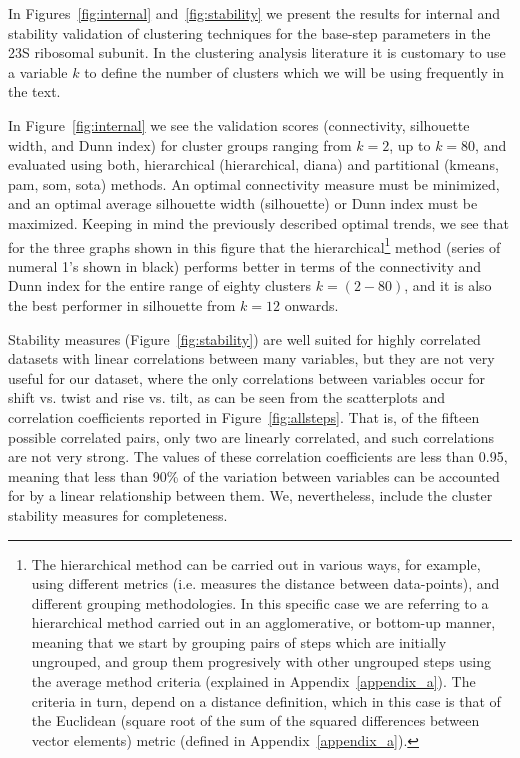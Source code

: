In  Figures~\ref{fig:internal} and~\ref{fig:stability} we  present the
results for internal and stability validation of clustering techniques
for the  base-step parameters  in the 23S  ribosomal subunit.   In the
clustering analysis literature  it is customary to use  a variable $k$
to define the number of clusters  which we will be using frequently in
the text.

In   Figure~\ref{fig:internal}   we    see   the   validation   scores
(connectivity, silhouette  width, and  Dunn index) for  cluster groups
ranging  from   $k=2$,  up  to  $k=80$,  and   evaluated  using  both,
hierarchical (hierarchical, diana)  and partitional (kmeans, pam, som,
sota) methods. An optimal  connectivity measure must be minimized, and
an optimal average silhouette width (silhouette) or Dunn index must be
maximized.  Keeping  in mind the previously  described optimal trends,
we  see that  for  the three  graphs  shown in  this  figure that  the
hierarchical\footnote{The  hierarchical method can  be carried  out in
  various ways,  for example, using different  metrics (i.e.  measures
  the   distance   between   data-points),  and   different   grouping
  methodologies.   In  this  specific  case  we  are  referring  to  a
  hierarchical method  carried out  in an agglomerative,  or bottom-up
  manner, meaning that  we start by grouping pairs  of steps which are
  initially  ungrouped,   and  group  them   progresively  with  other
  ungrouped  steps using  the  average method  criteria (explained  in
  Appendix~\ref{appendix_a}).  The  criteria  in  turn,  depend  on  a
  distance definition,  which in  this case is  that of  the Euclidean
  (square root  of the sum  of the squared differences  between vector
  elements)  metric (defined  in  Appendix~\ref{appendix_a}).}  method
(series of numeral 1's shown in black) performs better in terms of the
connectivity and  Dunn index for  the entire range of  eighty clusters
$k=(2-80)$,  and it  is also  the  best performer  in silhouette  from
$k=12$ onwards.

Stability  measures (Figure~\ref{fig:stability})  are well  suited for
highly  correlated  datasets  with  linear correlations  between  many
variables, but  they are  not very useful  for our dataset,  where the
only correlations between variables occur for shift vs. twist and rise
vs.   tilt, as  can  be  seen from  the  scatterplots and  correlation
coefficients reported  in Figure~\ref{fig:allsteps}.  That  is, of the
fifteen possible  correlated pairs, only two  are linearly correlated,
and  such correlations  are  not  very strong.   The  values of  these
correlation coefficients  are less than  0.95, meaning that  less than
90\%  of the variation  between variables  can be  accounted for  by a
linear  relationship  between  them.   We, nevertheless,  include  the
cluster stability measures for completeness.

